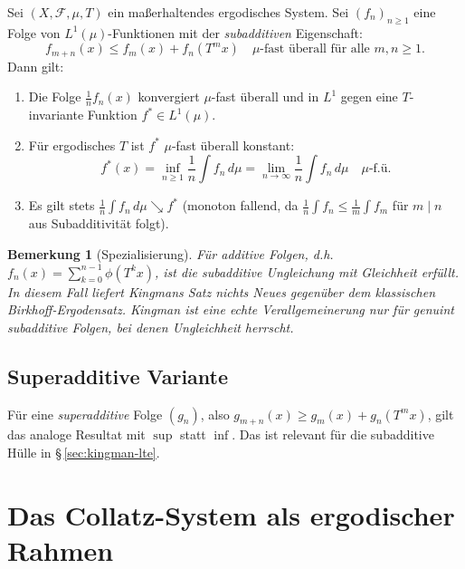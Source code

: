 \documentclass[12pt,a4paper]{article}
\newtheorem{bemerkung}[definition]{Bemerkung}
\begin{document}
\begin{tcolorbox}[hauptsatz, title={Kingmans Unteradditivitätssatz (Kingman 1968)}]
\label{satz:kingman}
Sei $(X, \mathcal{F}, \mu, T)$ ein maßerhaltendes ergodisches System.
Sei $(f_n)_{n \geq 1}$ eine Folge von $L^1(\mu)$-Funktionen mit der
\emph{subadditiven} Eigenschaft:
\[
  f_{m+n}(x) \leq f_m(x) + f_n(T^m x)
  \quad \mu\text{-fast überall für alle } m,n \geq 1.
\]
Dann gilt:
\begin{enumerate}[label=(\roman*)]
  \item Die Folge $\frac{1}{n} f_n(x)$ konvergiert $\mu$-fast überall und
    in $L^1$ gegen eine $T$-invariante Funktion $f^* \in L^1(\mu)$.
  \item Für ergodisches $T$ ist $f^*$ $\mu$-fast überall konstant:
    \[
      f^*(x) = \inf_{n \geq 1} \frac{1}{n}\int f_n \,d\mu
              = \lim_{n \to \infty} \frac{1}{n}\int f_n \,d\mu
              \quad \mu\text{-f.ü.}
    \]
  \item Es gilt stets $\frac{1}{n}\int f_n \,d\mu \searrow f^*$ (monoton
    fallend, da $\frac{1}{n}\int f_n \leq \frac{1}{m}\int f_m$ für $m \mid n$
    aus Subadditivität folgt).
\end{enumerate}
\end{tcolorbox}

\begin{bemerkung}[Spezialisierung]
Für \emph{additive} Folgen, d.h.\ $f_n(x) = \sum_{k=0}^{n-1} \phi(T^k x)$,
ist die subadditive Ungleichung mit Gleichheit erfüllt. In diesem Fall
liefert Kingmans Satz nichts Neues gegenüber dem klassischen
Birkhoff-Ergodensatz. Kingman ist eine \emph{echte Verallgemeinerung}
nur für genuint subadditive Folgen, bei denen Ungleichheit herrscht.
\end{bemerkung}

\subsection{Superadditive Variante}

Für eine \emph{superadditive} Folge $(g_n)$, also
$g_{m+n}(x) \geq g_m(x) + g_n(T^m x)$, gilt das analoge Resultat
mit $\sup$ statt $\inf$. Das ist relevant für die subadditive Hülle
in §\,\ref{sec:kingman-lte}.

\section{Das Collatz-System als ergodischer Rahmen}
\label{sec:system}
\end{document}
